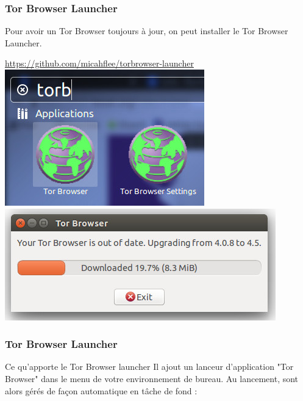 \documentclass{beamer}
\begin{document}
\begin{frame}
\frametitle{Tor Browser Launcher}
Pour avoir un Tor Browser toujours à jour, on peut installer le Tor Browser Launcher.
\begin{center}
\url{https://github.com/micahflee/torbrowser-launcher}
\\ \includegraphics[scale=0.3]{./images/tor_browser01.jpg}
\\ \includegraphics[scale=0.3]{./images/tor_browser02.jpg}
\end{center}
\end{frame}
\begin{frame}
\frametitle{Tor Browser Launcher}

\begin{block}{Ce qu'apporte le Tor Browser launcher}
Il ajout un lanceur d’application "Tor Browser" dans le menu de votre environnement de bureau. Au lancement, sont alors gérés de façon automatique en tâche de fond :
\begin{itemize}
\end{itemize}
\end{block}
\end{frame}
\end{document}

